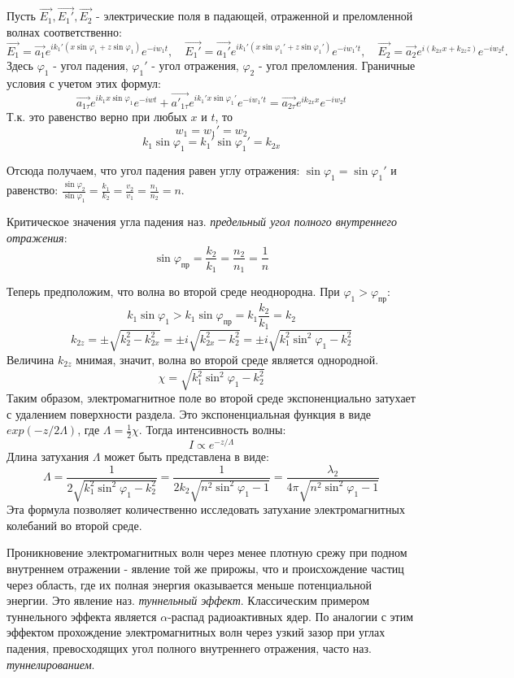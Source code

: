 \documentclass[a4paper,12pt]{article}
\begin{document}
Пусть $\vec{E_1}, \vec{E_1'}, \vec{E_2}$ - электрические поля в падающей, отраженной и преломленной волнах соответственно:
$$\vec{E_1}=\vec{a_1}e^{ik_1'(x\sin{\varphi_1}+z\sin{\varphi_1})}e^{-iw_1t}, \quad
\vec{E_1'}=\vec{a_1'}e^{ik_1'(x\sin{\varphi_1'}+z\sin{\varphi_1'})}e^{-iw_1't}, \quad
\vec{E_2}=\vec{a_2}e^{i(k_{2x}x+k_{2z}z)}e^{-iw_2t}.$$
Здесь $\varphi_1$ - угол падения, $\varphi_1'$ - угол отражения, $\varphi_2$ - угол преломления. Граничные условия с учетом этих формул:
$$
\vec{a_{1\tau}}e^{ik_1x\sin{\varphi_1}}e^{-iwt} + \vec{a'_{1\tau}}e^{ik_1'x\sin{\varphi_1'}}e^{-iw_1't} = \vec{a_{2\tau}}e^{ik_{2x}x}e^{-iw_2t}
$$
Т.к. это равенство верно при любых $x$ и $t$, то
$$
w_1 = w_1' = w_2
$$
$$
k_1\sin{\varphi_1}=k_1'\sin{\varphi_1'}=k_{2x}
$$

Отсюда получаем, что угол падения равен углу отражения: $\sin{\varphi_1}=\sin{\varphi_1'}$ и равенство: $\frac{\sin{\varphi_2}}{\sin{\varphi_1}}=\frac{k_1}{k_2} = \frac{v_2}{v_1} = \frac{n_1}{n_2} = n$.

Критическое значения угла падения наз. \textit{предельный угол полного внутреннего отражения}: 
$$
\sin{\varphi_\text{пр}} = \frac{k_2}{k_1} = \frac{n_2}{n_1} = \frac{1}{n}
$$

Теперь предположим, что волна во второй среде неоднородна. При $\varphi_1>\varphi_\text{пр}$:
$$
k_1\sin{\varphi_1} > k_1\sin{\varphi_\text{пр}} = k_1\frac{k_2}{k_1}=k_2
$$
$$
k_{2z} = \pm\sqrt{k_2^2-k_{2x}^2} = \pm i\sqrt{k_{2x}^2-k_2^2} = \pm i\sqrt{k_1^2\sin^2{\varphi_1}-k_2^2}
$$
Величина $k_{2z}$ мнимая, значит, волна во второй среде является однородной. 
$$
\chi = \sqrt{k_1^2\sin^2{\varphi_1}-k_2^2}
$$
Таким образом, электромагнитное поле во второй среде экспоненциально затухает с удалением поверхности раздела. Это экспоненциальная функция в виде $exp(-z/2\Lambda)$, где $\Lambda=\frac{1}{2}\chi$. Тогда интенсивность волны:
$$
I \varpropto e^{-z/\Lambda}
$$
Длина затухания $\Lambda$ может быть представлена в виде:
$$
\Lambda = \frac{1}{2\sqrt{k_1^2\sin^2{\varphi_1}-k_2^2}} = \frac{1}{2k_2\sqrt{n^2\sin^2{\varphi_1}-1}} = \frac{\lambda_2}{4\pi\sqrt{n^2\sin^2{\varphi_1}-1}}
$$
Эта формула позволяет количественно исследовать затухание электромагнитных колебаний во второй среде.

Проникновение электромагнитных волн через менее плотную срежу при подном внутреннем отражении - явление той же прирожы, что и происхождение частиц через область, где их полная энергия оказывается меньше потенциальной энергии. Это явление наз. \textit{туннельный эффект}. Классическим примером туннельного эффекта является $\alpha$-распад радиоактивных ядер. По аналогии с этим эффектом прохождение электромагнитных волн через узкий зазор при углах падения, превосходящих угол полного внутреннего отражения, часто наз. \textit{туннелированием}.
\end{document}
